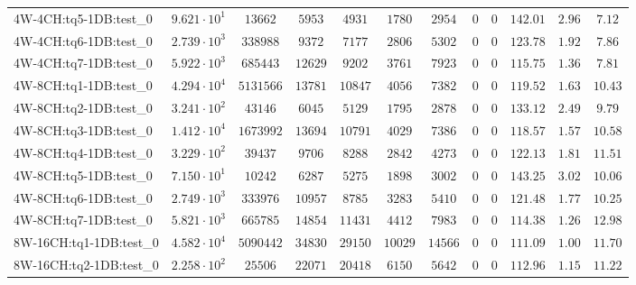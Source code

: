 \begin{tabular}{|l|c|c|c|c|c|c|c|c|c|c|c|}
4W-4CH:tq5-1DB:test\_0   & $ 9.621 \cdot 10^{1} $ & $ 13662     $ & $ 5953    $ & $ 4931   $ & $ 1780   $ & $ 2954   $ & $ 0 $ & $ 0 $ & $ 142.01      $ & $ 2.96    $ & $ 7.12    $ \\
4W-4CH:tq6-1DB:test\_0   & $ 2.739 \cdot 10^{3} $ & $ 338988    $ & $ 9372    $ & $ 7177   $ & $ 2806   $ & $ 5302   $ & $ 0 $ & $ 0 $ & $ 123.78      $ & $ 1.92    $ & $ 7.86    $ \\
4W-4CH:tq7-1DB:test\_0   & $ 5.922 \cdot 10^{3} $ & $ 685443    $ & $ 12629   $ & $ 9202   $ & $ 3761   $ & $ 7923   $ & $ 0 $ & $ 0 $ & $ 115.75      $ & $ 1.36    $ & $ 7.81    $ \\
4W-8CH:tq1-1DB:test\_0   & $ 4.294 \cdot 10^{4} $ & $ 5131566   $ & $ 13781   $ & $ 10847  $ & $ 4056   $ & $ 7382   $ & $ 0 $ & $ 0 $ & $ 119.52      $ & $ 1.63    $ & $ 10.43   $ \\
4W-8CH:tq2-1DB:test\_0   & $ 3.241 \cdot 10^{2} $ & $ 43146     $ & $ 6045    $ & $ 5129   $ & $ 1795   $ & $ 2878   $ & $ 0 $ & $ 0 $ & $ 133.12      $ & $ 2.49    $ & $ 9.79    $ \\
4W-8CH:tq3-1DB:test\_0   & $ 1.412 \cdot 10^{4} $ & $ 1673992   $ & $ 13694   $ & $ 10791  $ & $ 4029   $ & $ 7386   $ & $ 0 $ & $ 0 $ & $ 118.57      $ & $ 1.57    $ & $ 10.58   $ \\
4W-8CH:tq4-1DB:test\_0   & $ 3.229 \cdot 10^{2} $ & $ 39437     $ & $ 9706    $ & $ 8288   $ & $ 2842   $ & $ 4273   $ & $ 0 $ & $ 0 $ & $ 122.13      $ & $ 1.81    $ & $ 11.51   $ \\
4W-8CH:tq5-1DB:test\_0   & $ 7.150 \cdot 10^{1} $ & $ 10242     $ & $ 6287    $ & $ 5275   $ & $ 1898   $ & $ 3002   $ & $ 0 $ & $ 0 $ & $ 143.25      $ & $ 3.02    $ & $ 10.06   $ \\
4W-8CH:tq6-1DB:test\_0   & $ 2.749 \cdot 10^{3} $ & $ 333976    $ & $ 10957   $ & $ 8785   $ & $ 3283   $ & $ 5410   $ & $ 0 $ & $ 0 $ & $ 121.48      $ & $ 1.77    $ & $ 10.25   $ \\
4W-8CH:tq7-1DB:test\_0   & $ 5.821 \cdot 10^{3} $ & $ 665785    $ & $ 14854   $ & $ 11431  $ & $ 4412   $ & $ 7983   $ & $ 0 $ & $ 0 $ & $ 114.38      $ & $ 1.26    $ & $ 12.98   $ \\
8W-16CH:tq1-1DB:test\_0  & $ 4.582 \cdot 10^{4} $ & $ 5090442   $ & $ 34830   $ & $ 29150  $ & $ 10029  $ & $ 14566  $ & $ 0 $ & $ 0 $ & $ 111.09      $ & $ 1.00    $ & $ 11.70   $ \\
8W-16CH:tq2-1DB:test\_0  & $ 2.258 \cdot 10^{2} $ & $ 25506     $ & $ 22071   $ & $ 20418  $ & $ 6150   $ & $ 5642   $ & $ 0 $ & $ 0 $ & $ 112.96      $ & $ 1.15    $ & $ 11.22   $ \\

\end{tabular}
